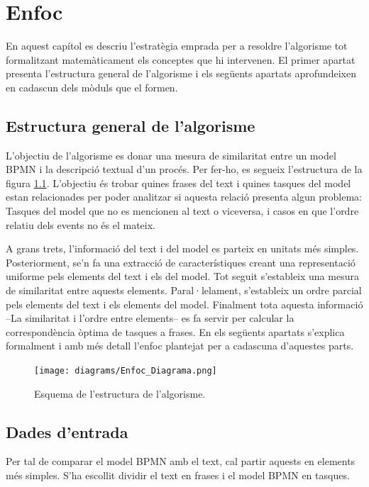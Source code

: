 \chapter{Enfoc}
\label{cha:enfoc}

En aquest capítol es descriu l'estratègia emprada per a resoldre l'algorisme tot formalitzant matemàticament els conceptes que hi intervenen. El primer apartat presenta l'estructura general de l'algorisme i els següents apartats aprofundeixen en cadascun dels mòduls que el formen.

\section{Estructura general de l'algorisme}

L'objectiu de l'algorisme es donar una mesura de similaritat entre un model BPMN i la descripció textual d'un procés. Per fer-ho, es segueix l'estructura de la figura \ref{fig:estructura}. L'objectiu és trobar quines frases del text i quines tasques del model estan relacionades per poder analitzar si aquesta relació presenta algun problema: Tasques del model que no es mencionen al text o viceversa, i casos en que l'ordre relatiu dels events no és el mateix.

A grans trets, l'informació del text i del model es parteix en unitats més simples. Posteriorment, se'n fa una extracció de característiques creant una representació uniforme pels elements del text i els del model. Tot seguit s'estableix una mesura de similaritat entre aquests elements. Paral·lelament, s'estableix un ordre parcial pels elements del text i els elements del model. Finalment tota aquesta informació --La similaritat i l'ordre entre elements-- es fa servir per calcular la correspondència òptima de tasques a frases. En els següents apartats s'explica formalment i amb més detall l'enfoc plantejat per a cadascuna d'aquestes parts.

\begin{figure}[!hbt]
    \texttt{[image: diagrams/Enfoc\_Diagrama.png]}
    \caption{Esquema de l'estructura de l'algorisme.}
    \label{fig:estructura}
\end{figure}

\section{Dades d'entrada}

Per tal de comparar el model BPMN amb el text, cal partir aquests en elements més simples. S'ha escollit dividir el text en frases i el model BPMN en tasques. 

